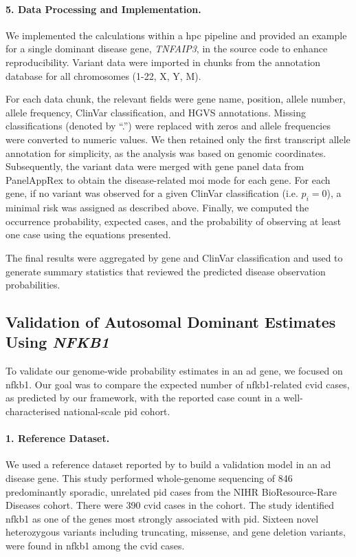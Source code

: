 \paragraph{5. Data Processing and Implementation.}
We implemented the calculations within a \ac{hpc} pipeline and provided an example for a single dominant disease gene, \textit{TNFAIP3}, in the source code to enhance reproducibility. Variant data were imported in chunks from the annotation database for all chromosomes (1-22, X, Y, M). 

For each data chunk, the relevant fields were gene name, position, allele number, allele frequency, ClinVar classification, and HGVS annotations. Missing classifications (denoted by ``.'') were replaced with zeros and allele frequencies were converted to numeric values. We then retained only the first transcript allele annotation for simplicity, as the analysis was based on genomic coordinates. Subsequently, the variant data were merged with gene panel data from PanelAppRex to obtain the disease-related \ac{moi} mode for each gene. For each gene, if no variant was observed for a given ClinVar classification (i.e. \(p_i = 0\)), a minimal risk was assigned as described above. Finally, we computed the occurrence probability, expected cases, and the probability of observing at least one case using the equations presented.

The final results were aggregated by gene and ClinVar classification and used to generate summary statistics that reviewed the predicted disease observation probabilities.


\subsection{Validation of Autosomal Dominant Estimates Using \textit{NFKB1}}

To validate our genome-wide probability estimates in an \ac{ad} gene, we focused on \ac{nfkb1}. Our goal was to compare the expected number of \ac{nfkb1}-related \ac{cvid} cases, as predicted by our framework, with the reported case count in a well-characterised national-scale \ac{pid} cohort.

\paragraph{1. Reference Dataset.}
We used a reference dataset reported by \citet{tuijnenburgNFKB12018} to build a validation model in an \ac{ad} disease gene. This study performed whole‐genome sequencing of 846 predominantly sporadic, unrelated \ac{pid} cases from the NIHR BioResource-Rare Diseases cohort. There were 390 \ac{cvid} cases in the cohort. The study identified \ac{nfkb1} as one of the genes most strongly associated with \ac{pid}. Sixteen novel heterozygous variants including truncating, missense, and gene deletion variants, were found in \ac{nfkb1} among the \ac{cvid} cases.

